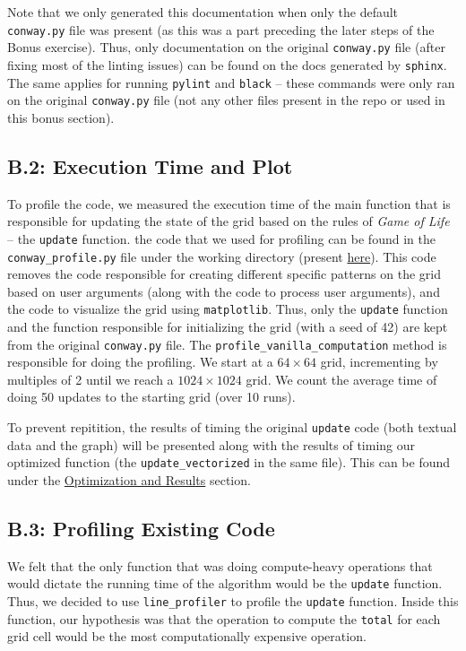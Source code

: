 \documentclass[a4paper,12pt]{article}
\begin{document}
Note that we only generated this documentation when only the default \verb|conway.py| file was present (as this was a part preceding the later steps of the Bonus exercise). Thus, only documentation on  the original \verb|conway.py| file (after fixing most of the linting issues) can be found on the docs generated by \verb|sphinx|. The same applies for running \verb|pylint| and \verb|black| -- these commands were only ran on the original \verb|conway.py| file (not any other files present in the repo or used in this bonus section).

\subsection{B.2: Execution Time and Plot}
To profile the code, we measured the execution time of the main function that is responsible for updating the state of the grid based on the rules of \textit{Game of Life} -- the \verb|update| function. the code that we used for profiling can be found in the \verb|conway_profile.py| file under the working directory (present \href{https://github.com/paulmyr/DD2358-HPC25/blob/master/02_hpcds/bonus/conway_profile.py}{here}). This code removes the code responsible for creating different specific patterns on the grid based on user arguments (along with the code to process user arguments), and the code to visualize the grid using \verb|matplotlib|. Thus, only the \verb|update| function and the function responsible for initializing the grid (with a seed of 42) are kept from the original \verb|conway.py| file. The \verb|profile_vanilla_computation| method is responsible for doing the profiling. We start at a $64 \times 64$ grid, incrementing by multiples of 2 until we reach a $1024 \times 1024$ grid. We count the average time of doing 50 updates to the starting grid (over 10 runs). 

To prevent repitition, the results of timing the original \verb|update| code (both textual data and the graph) will be presented along with the results of timing our optimized function (the \verb|update_vectorized| in the same file). This can be found under the \hyperref[sec:b4]{Optimization and Results} section.

\subsection{B.3: Profiling Existing Code}
\label{sec:b3}
We felt that the only function that was doing compute-heavy operations that would dictate the running time of the algorithm would be the \verb|update| function. Thus, we decided to use \verb|line_profiler| to profile the \verb|update| function. Inside this function, our hypothesis was that the operation to compute the \verb|total| for each grid cell would be the most computationally expensive operation.
\end{document}
